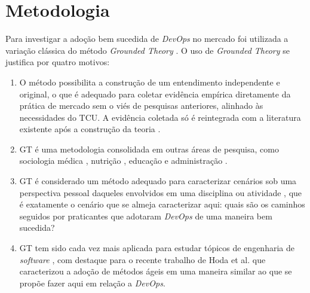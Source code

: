
\section{Metodologia}

Para investigar a adoção bem sucedida de \textit{DevOps} no mercado foi
utilizada a variação clássica do método \textit{Grounded Theory} \cite{glaser1967discovery}.
O uso de \textit{Grounded Theory} se justifica por quatro motivos:

\begin{enumerate}

\item O método possibilita a construção de um entendimento independente e original,
o que é adequado para coletar evidência empírica diretamente da prática de
mercado sem o viés de pesquisas anteriores, alinhado às necessidades do \acrshort{TCU}.
A evidência coletada só é reintegrada com a literatura existente após a
construção da teoria \cite{reconciling_perspectives,stol2016grounded}.

\item \acrshort{GT} é uma metodologia consolidada em outras áreas de
pesquisa, como sociologia médica \cite{gt_medical_sociology}, nutrição
\cite{gt_nursing}, educação \cite{gt_education} e administração
\cite{gt_management,locke2001grounded}.

\item \acrshort{GT} é considerado um método adequado para caracterizar cenários
sob uma perspectiva pessoal daqueles envolvidos em uma disciplina ou atividade \cite{stol2016grounded},
que é exatamente o cenário que se almeja caracterizar aqui: quais são os caminhos
seguidos por praticantes que adotaram \textit{DevOps} de uma maneira bem sucedida?

\item \acrshort{GT} tem sido cada vez mais aplicada para estudar tópicos de
engenharia de \textit{software} \cite{hoda2017becoming,Waterman:2015:ICSE,stol2016grounded},
com destaque para o recente trabalho de Hoda et al. \cite{hoda2017becoming} que
caracterizou a adoção de métodos ágeis em uma maneira similar ao que se propõe
fazer aqui em relação a \textit{DevOps}.

\end{enumerate}

